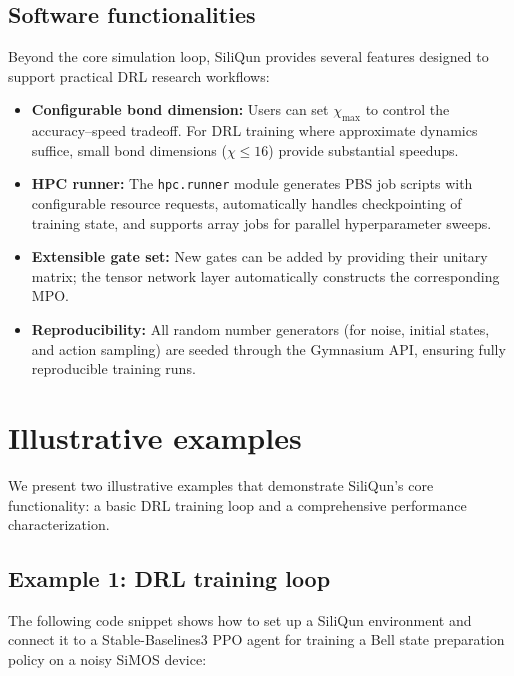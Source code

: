\documentclass[preprint,12pt, a4paper]{elsarticle}
\begin{document}
\subsection{Software functionalities}

Beyond the core simulation loop, SiliQun provides several features designed to support practical DRL research workflows:

\begin{itemize}
    \item \textbf{Configurable bond dimension:} Users can set $\chi_{\max}$ to control the accuracy--speed tradeoff. For DRL training where approximate dynamics suffice, small bond dimensions ($\chi \leq 16$) provide substantial speedups.
    \item \textbf{HPC runner:} The \texttt{hpc.runner} module generates PBS job scripts with configurable resource requests, automatically handles checkpointing of training state, and supports array jobs for parallel hyperparameter sweeps.
    \item \textbf{Extensible gate set:} New gates can be added by providing their unitary matrix; the tensor network layer automatically constructs the corresponding MPO.
    \item \textbf{Reproducibility:} All random number generators (for noise, initial states, and action sampling) are seeded through the Gymnasium API, ensuring fully reproducible training runs.
\end{itemize}

\section{Illustrative examples}
\label{sec:examples}

We present two illustrative examples that demonstrate SiliQun's core functionality: a basic DRL training loop and a comprehensive performance characterization.

\subsection{Example 1: DRL training loop}

The following code snippet shows how to set up a SiliQun environment and connect it to a Stable-Baselines3 PPO agent for training a Bell state preparation policy on a noisy SiMOS device:
\end{document}

